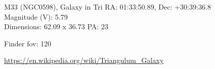 \begin{block}{M33 (NGC0598), Galaxy in Tri}
    RA: 01:33:50.89, Dec: +30:39:36.8 \\ 
    Magnitude (V): 5.79 \\ 
    Dimensions: 62.09 x 36.73 PA: 23 

    Finder fov: 120 

    \url{https://en.wikipedia.org/wiki/Triangulum_Galaxy} 
\end{block}